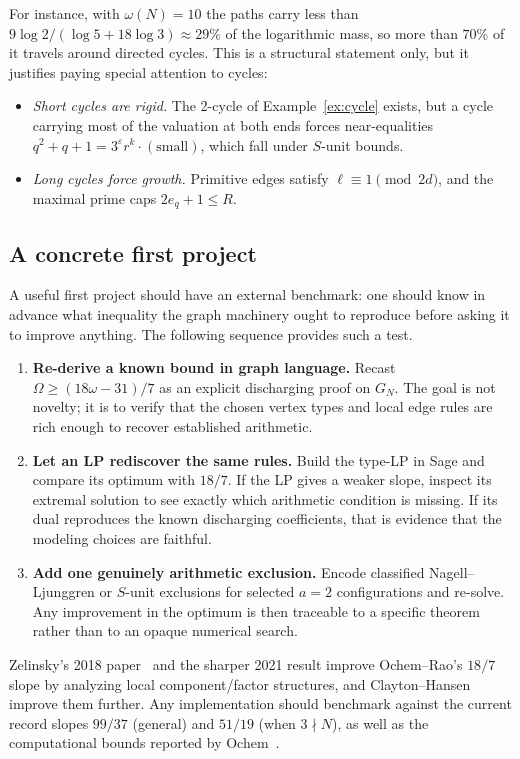 \documentclass[11pt]{article}
\theoremstyle{definition}
\theoremstyle{remark}
\begin{document}
For instance, with $\omega(N)=10$ the paths carry less than
$9\log2/(\log5+18\log3)\approx29\%$ of the logarithmic mass, so more than
$70\%$ of it travels around directed cycles.  This is a structural statement
only, but it justifies paying special attention to cycles:
\begin{itemize}[leftmargin=1.5em]
\item \emph{Short cycles are rigid.} The 2-cycle of
  Example~\ref{ex:cycle} exists, but a cycle carrying most of the
  valuation at both ends forces near-equalities
  $q^2+q+1=3^{\varepsilon}r^k\cdot(\text{small})$, which fall under
  $S$-unit bounds.
\item \emph{Long cycles force growth.} Primitive edges satisfy
  $\ell\equiv1\pmod{2d}$, and the maximal prime caps $2e_q+1\le R$.
\end{itemize}

\subsection{A concrete first project}

A useful first project should have an external benchmark: one should know in
advance what inequality the graph machinery ought to reproduce before asking
it to improve anything.  The following sequence provides such a test.

\begin{enumerate}[leftmargin=1.5em]
\item \textbf{Re-derive a known bound in graph language.}  Recast
  $\Omega\ge(18\omega-31)/7$ as an explicit discharging proof on $G_N$.
  The goal is not novelty; it is to verify that the chosen vertex types and
  local edge rules are rich enough to recover established arithmetic.
\item \textbf{Let an LP rediscover the same rules.}  Build the type-LP in
  Sage and compare its optimum with $18/7$.  If the LP gives a weaker slope,
  inspect its extremal solution to see exactly which arithmetic condition is
  missing.  If its dual reproduces the known discharging coefficients, that
  is evidence that the modeling choices are faithful.
\item \textbf{Add one genuinely arithmetic exclusion.}  Encode classified
  Nagell--Ljunggren or $S$-unit exclusions for selected $a=2$
  configurations and re-solve.  Any improvement in the optimum is then
  traceable to a specific theorem rather than to an opaque numerical search.
\end{enumerate}
Zelinsky's 2018 paper~\cite{Zelinsky} and the sharper 2021 result
\cite{Zelinsky2021} improve Ochem--Rao's $18/7$ slope by analyzing local
component/factor structures, and Clayton--Hansen~\cite{ClaytonHansen}
improve them further.  Any implementation should benchmark against the
current record slopes $99/37$ (general) and $51/19$ (when $3\nmid N$), as
well as the computational bounds reported by Ochem~\cite{OchemWeb}.
\end{document}
